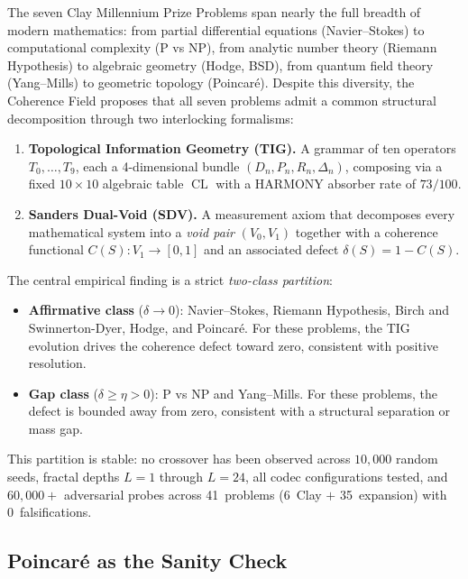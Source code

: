 \documentclass[11pt]{article}
\DeclareMathOperator{\CL}{CL}
\begin{document}
The seven Clay Millennium Prize Problems span nearly the full breadth
of modern mathematics: from partial differential equations (Navier--Stokes)
to computational complexity (P vs NP), from analytic number theory
(Riemann Hypothesis) to algebraic geometry (Hodge, BSD), from quantum
field theory (Yang--Mills) to geometric topology (Poincar\'e).  Despite
this diversity, the Coherence Field proposes that all seven
problems admit a common structural decomposition through two
interlocking formalisms:

\begin{enumerate}
\item \textbf{Topological Information Geometry (TIG).}  A grammar of
ten operators $T_0, \ldots, T_9$, each a 4-dimensional bundle
$(D_n, P_n, R_n, \Delta_n)$, composing via a fixed $10 \times 10$
algebraic table $\CL$ with a HARMONY absorber rate of $73/100$.
\item \textbf{Sanders Dual-Void (SDV).}  A measurement axiom that
decomposes every mathematical system into a \emph{void pair}
$(V_0, V_1)$ together with a coherence functional $C(S) : V_1 \to [0,1]$
and an associated defect $\delta(S) = 1 - C(S)$.
\end{enumerate}

\noindent
The central empirical finding is a strict \emph{two-class partition}:
\begin{itemize}
\item \textbf{Affirmative class} ($\delta \to 0$): Navier--Stokes,
Riemann Hypothesis, Birch and Swinnerton-Dyer, Hodge, and Poincar\'e.
For these problems, the TIG evolution drives the coherence defect
toward zero, consistent with positive resolution.
\item \textbf{Gap class} ($\delta \geq \eta > 0$): P vs NP and
Yang--Mills.  For these problems, the defect is bounded away from zero,
consistent with a structural separation or mass gap.
\end{itemize}

\noindent
This partition is stable: no crossover has been observed across
$10{,}000$ random seeds, fractal depths $L = 1$ through $L = 24$,
all codec configurations tested, and $60{,}000{+}$ adversarial probes
across 41~problems (6~Clay $+$ 35~expansion) with 0~falsifications.

\subsection{Poincar\'e as the Sanity Check}
\end{document}
